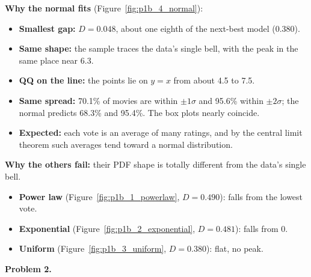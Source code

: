 \documentclass[11pt]{article}
\newcommand{\prompt}[1]{\textcolor{prompt}{#1}}
\begin{document}
\begin{enumerate}
{    \textbf{Why the normal fits} (Figure~\ref{fig:p1b_4_normal}):
    \begin{itemize}
      \item \textbf{Smallest gap:} $D = 0.048$, about one eighth of the next-best model (0.380).
      \item \textbf{Same shape:} the sample traces the data's single bell, with the peak in
            the same place near 6.3.
      \item \textbf{QQ on the line:} the points lie on $y = x$ from about 4.5 to 7.5.
      \item \textbf{Same spread:} 70.1\% of movies are within $\pm1\sigma$ and 95.6\% within
            $\pm2\sigma$; the normal predicts 68.3\% and 95.4\%. The box plots nearly coincide.
      \item \textbf{Expected:} each vote is an average of many ratings, and by the central
            limit theorem such averages tend toward a normal distribution.
    \end{itemize}

    \textbf{Why the others fail:} their PDF shape is totally different from the data's
    single bell.
    \begin{itemize}
      \item \textbf{Power law} (Figure~\ref{fig:p1b_1_powerlaw}, $D = 0.490$): falls from the
            lowest vote.
      \item \textbf{Exponential} (Figure~\ref{fig:p1b_2_exponential}, $D = 0.481$): falls from 0.
      \item \textbf{Uniform} (Figure~\ref{fig:p1b_3_uniform}, $D = 0.380$): flat, no peak.
    \end{itemize}}
\end{enumerate}

\clearpage
\prompt{\textbf{Problem 2.}}
\end{document}
